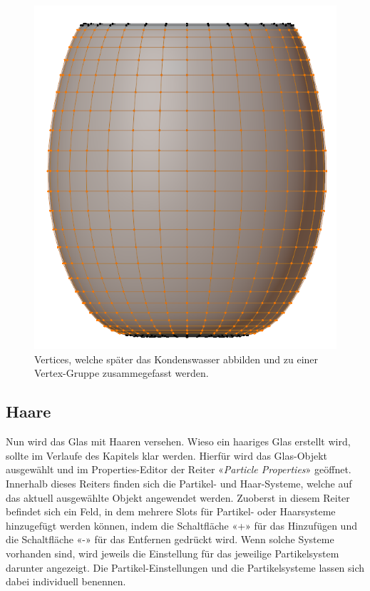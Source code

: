 \documentclass[
]{book}
\let\oldmarginnote\marginnote
\renewcommand{\marginnote}[1]{%
  \oldmarginnote{{\footnotesize\selectfont #1}}%
}
\begin{document}
\begin{figure}

\includegraphics{Chapters/Images/Chapter_38/38_7_Condense_Select_Group.png}

\caption{\label{fig-1_7}Vertices, welche später das Kondenswasser
abbilden und zu einer Vertex-Gruppe zusammegefasst werden.}

\end{figure}%

\subsection{Haare}\label{haare}

\marginnote{Particle-Properties}

Nun wird das Glas mit Haaren versehen. Wieso ein haariges Glas erstellt
wird, sollte im Verlaufe des Kapitels klar werden. Hierfür wird das
Glas-Objekt ausgewählt und im Properties-Editor der Reiter
«\emph{Particle Properties}» geöffnet. Innerhalb dieses Reiters finden
sich die Partikel- und Haar-Systeme, welche auf das aktuell ausgewählte
Objekt angewendet werden. Zuoberst in diesem Reiter befindet sich ein
Feld, in dem mehrere Slots für Partikel- oder Haarsysteme hinzugefügt
werden können, indem die Schaltfläche «+» für das Hinzufügen und die
Schaltfläche «-» für das Entfernen gedrückt wird. Wenn solche Systeme
vorhanden sind, wird jeweils die Einstellung für das jeweilige
Partikelsystem darunter angezeigt. Die Partikel-Einstellungen und die
Partikelsysteme lassen sich dabei individuell benennen.
\end{document}
